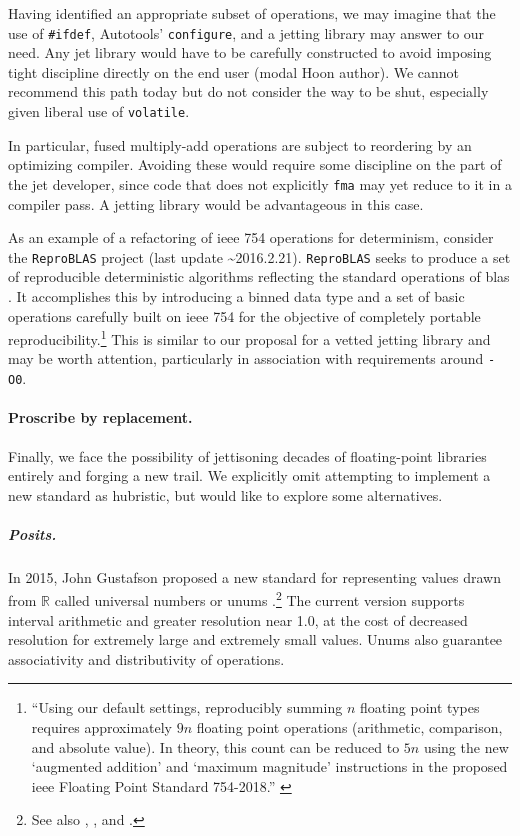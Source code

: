 \documentclass[twoside]{article}
\begin{document}
Having identified an appropriate subset of operations, we may imagine that the use of \texttt{\#ifdef}, Autotools’ \texttt{configure}, and a jetting library may answer to our need.  Any jet library would have to be carefully constructed to avoid imposing tight discipline directly on the end user (modal Hoon author).  We cannot recommend this path today but do not consider the way to be shut, especially given liberal use of \texttt{volatile}.

In particular, fused multiply-add operations are subject to reordering by an optimizing compiler.  Avoiding these would require some discipline on the part of the jet developer, since code that does not explicitly \texttt{fma} may yet reduce to it in a compiler pass.  A jetting library would be advantageous in this case.

As an example of a refactoring of {\sc ieee} 754 operations for determinism, consider the \texttt{ReproBLAS} project (last update \textasciitilde 2016.2.21).   \texttt{ReproBLAS} seeks to produce a set of reproducible deterministic algorithms reflecting the standard operations of {\sc blas} \citep{ReproBLAS}.  It accomplishes this by introducing a binned data type and a set of basic operations carefully built on {\sc ieee} 754 for the objective of completely portable reproducibility.\footnote{“Using our default settings, reproducibly summing $n$ floating point types requires approximately $9n$ floating point operations (arithmetic, comparison, and absolute value). In theory, this count can be reduced to $5n$ using the new `augmented addition' and `maximum magnitude' instructions in the proposed {\sc ieee} Floating Point Standard 754-2018.”  \citep{ReproBLAS}}  This is similar to our proposal for a vetted jetting library and may be worth attention, particularly in association with requirements around \texttt{-O0}.

\paragraph{Proscribe by replacement.}

Finally, we face the possibility of jettisoning decades of floating-point libraries entirely and forging a new trail.  We explicitly omit attempting to implement a new standard as hubristic, but would like to explore some alternatives.

\subparagraph{Posits.}

In 2015, John Gustafson proposed a new standard for representing values drawn from $\mathbb{R}$ called universal numbers or unums \citep{Gustafson2015}.\footnote{See also \citet{Gustafson2017}, \citet{Gustafson2017a}, and \citet{Gustafson2017b}.}  The current version supports interval arithmetic and greater resolution near 1.0, at the cost of decreased resolution for extremely large and extremely small values.  Unums also guarantee associativity and distributivity of operations.
\end{document}
